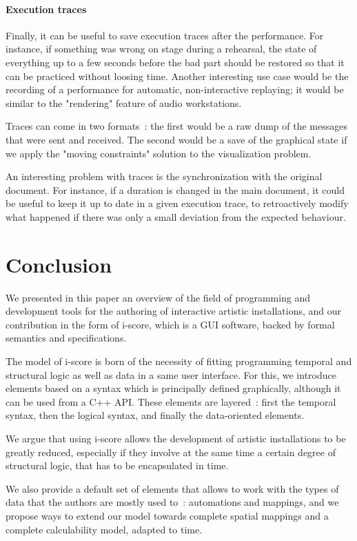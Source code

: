 \documentclass{sigchi}
\begin{document}
\paragraph{Execution traces}
Finally, it can be useful to save execution traces after the performance. For instance, if something was wrong on stage during a rehearsal, the state of everything up to a few seconds before the bad part should be restored so that it can be practiced without loosing time.
Another interesting use case would be the recording of a performance for automatic, non-interactive replaying; it would be similar to the "rendering" feature of audio workstations.

Traces can come in two formats~: the first would be a raw dump of the messages that were sent and received.
The second would be a save of the graphical state if we apply the "moving constraints" solution to the visualization problem.

An interesting problem with traces is the synchronization with the original document. For instance, if a duration is changed in the main document, it could be useful to keep it up to date in a given execution trace, to retroactively modify what happened if there was only a small deviation from the expected behaviour.

\section{Conclusion}
We presented in this paper an overview of the field of programming and development tools for the authoring of interactive artistic installations, and our contribution in the form of i-score, which is a GUI software, backed by formal semantics and specifications. 

The model of i-score is born of the necessity of fitting programming temporal and structural logic as well as data in a same user interface. For this, we introduce elements based on a syntax which is principally defined graphically, although it can be used from a C++ API. These elements are layered~: first the temporal syntax, then the logical syntax, and finally the data-oriented elements.  

We argue that using i-score allows the development of artistic installations to be greatly reduced, especially if they involve at the same time a certain degree of structural logic, that has to be encapsulated in time.

We also provide a default set of elements that allows to work with the types of data that the authors are mostly used to~: automations and mappings, and we propose ways to extend our model towards complete spatial mappings and a complete calculability model, adapted to time.
\end{document}
